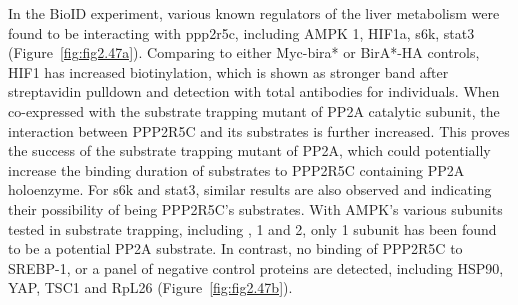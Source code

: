 In the BioID experiment, various known regulators of the liver metabolism were found to be interacting with \gls{ppp2r5c}, including \gls{AMPK} \textbeta{}1, \gls{HIF1a}, \gls{s6k}, \gls{stat3} (Figure~\ref{fig:fig2.47a}). Comparing to either Myc-\gls{bira}* or BirA*-HA controls, HIF1\textalpha{} has increased biotinylation, which is shown as stronger band after streptavidin pulldown and detection with total antibodies for individuals. When co-expressed with the substrate trapping mutant of \gls{PP2A} catalytic subunit, the interaction between PPP2R5C and its substrates is further increased. This proves the success of the substrate trapping mutant of PP2A, which could potentially increase the binding duration of substrates to PPP2R5C containing PP2A holoenzyme. For \gls{s6k} and \gls{stat3}, similar results are also observed and indicating their possibility of being PPP2R5C's substrates. With \gls{AMPK}'s various subunits tested in substrate trapping, including \textalpha{}, \textbeta{}1 and \textbeta{}2, only \textbeta{}1 subunit has been found to be a potential PP2A substrate. In contrast, no binding of PPP2R5C to SREBP-1, or a panel of negative control proteins are detected, including HSP90, YAP, TSC1 and RpL26 (Figure~\ref{fig:fig2.47b}).

